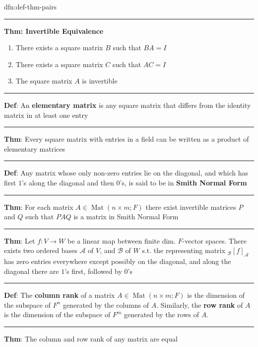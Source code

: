 \documentclass[landscape, 8pt]{extarticle}
\DeclareMathOperator{\Mat}{Mat}
\begin{document}
\begin{multicols}{3}
\begin{dfn}{dfn:def-thm-pairs}{}
    \vspace{-5pt}
    \noindent\rule{\textwidth}{0.2pt}
    \textbf{Thm: Invertible Equivalence}
    \begin{enumerate}
        \setlength\itemsep{0em}
        \item There exists a square matrix $B$ such that $BA = I$
        \item There exists a square matrix $C$ such that $AC = I$
        \item The square matrix $A$ is invertible
    \end{enumerate}

    \vspace{-5pt}
    \noindent\rule{\textwidth}{0.6pt}
    \textbf{Def}: An \textbf{elementary matrix} is any square matrix that differs from the identity matrix in at least one entry

    \vspace{-5pt}
    \noindent\rule{\textwidth}{0.2pt}
    \textbf{Thm}: Every square matrix with entries in a field can be written as a product of elementary matrices

    \noindent\rule{\textwidth}{0.6pt}
    \textbf{Def}: Any matrix whose only non-zero entries lie on the diagonal, and which has first $1$'s along the diagonal and then $0$'s, is said to be in \textbf{Smith Normal Form}

    \vspace{-5pt}
    \noindent\rule{\textwidth}{0.2pt}
    \textbf{Thm}: For each matrix $A\in \Mat(n \times m; F)$ there exist invertible matrices $P$ and $Q$ such that $PAQ$ is a matrix in Smith Normal Form
    
    \vspace{-5pt}
    \noindent\rule{\textwidth}{0.2pt}
    \textbf{Thm}: Let $f : V \to W$ be a linear map between finite dim. $F$-vector spaces. There exists two ordered bases $\mathcal{A}$ of $V$, and $\mathcal{B}$ of $W$ s.t. the representing matrix ${}_{\mathcal{B}}[f]_{\mathcal{A}}$ has zero entries everywhere except possibly on the diagonal, and along the diagonal there are $1$'s first, followed by $0$'s

    \noindent\rule{\textwidth}{0.6pt}
    \textbf{Def}: The \textbf{column rank} of a matrix $A\in \Mat(n \times m; F)$ is the dimension of the subspace of $F^{n}$ generated by the columns of $A$. Similarly, the \textbf{row rank} of $A$ is the dimension of the subspace of $F^{m}$ generated by the rows of $A$.

    \vspace{-5pt}
    \noindent\rule{\textwidth}{0.2pt}
    \textbf{Thm}: The column and row rank of any matrix are equal


\end{dfn}
\end{multicols}
\end{document}
